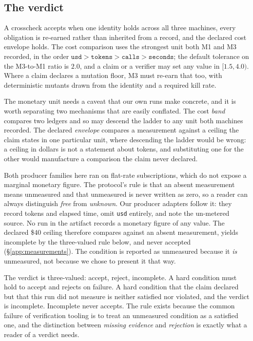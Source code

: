 \documentclass[10pt,twocolumn]{article}
\begin{document}
\subsection{The verdict}

A crosscheck accepts when one identity holds across all three machines,
every obligation is re-earned rather than inherited from a record, and
the declared cost envelope holds. The cost comparison uses the strongest
unit both M1 and M3 recorded, in the order
$\mathtt{usd} > \mathtt{tokens} > \mathtt{calls} > \mathtt{seconds}$;
the default tolerance on the M3-to-M1 ratio is $2.0$, and a claim or a
verifier may set any value in $[1.5, 4.0)$. Where a claim declares a
mutation floor, M3 must re-earn that too, with deterministic mutants
drawn from the identity and a required kill rate.

The monetary unit needs a caveat that our own runs make concrete, and it
is worth separating two mechanisms that are easily conflated. The cost
\emph{band} compares two ledgers and so may descend the ladder to any
unit both machines recorded. The declared \emph{envelope} compares a
measurement against a ceiling the claim states in one particular unit,
where descending the ladder would be wrong: a ceiling in dollars is not
a statement about tokens, and substituting one for the other would
manufacture a comparison the claim never declared.

Both producer families here ran on flat-rate subscriptions, which do not
expose a marginal monetary figure. The protocol's rule is that an absent
measurement means unmeasured and that unmeasured is never written as
zero, so a reader can always distinguish \emph{free} from
\emph{unknown}. Our producer adapters follow it: they record tokens and
elapsed time, omit \texttt{usd} entirely, and note the un-metered
source. No run in the artifact records a monetary figure of any value.
The declared \$40 ceiling therefore compares against an absent
measurement, yields \textsf{incomplete} by the three-valued rule below,
and never accepted (\S\ref{app:measurements}). The condition is reported
as unmeasured because it \emph{is} unmeasured, not because we chose to
present it that way.

The verdict is three-valued: \textsf{accept}, \textsf{reject},
\textsf{incomplete}. A hard condition must hold to accept and rejects on
failure. A hard condition that the claim declared but that this run did
not measure is neither satisfied nor violated, and the verdict is
\textsf{incomplete}. Incomplete never accepts. The rule exists because
the common failure of verification tooling is to treat an unmeasured
condition as a satisfied one, and the distinction between \emph{missing
evidence} and \emph{rejection} is exactly what a reader of a verdict
needs.
\end{document}
